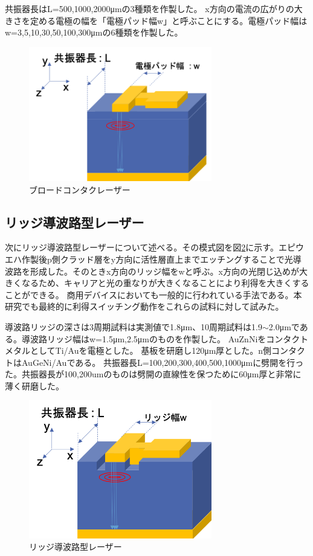 共振器長はL=500,1000,2000\si{\micro\metre}の3種類を作製した。
x方向の電流の広がりの大きさを定める電極の幅を「電極パッド幅w」と呼ぶことにする。電極パッド幅はw=3,5,10,30,50,100,300\si{\micro\metre}の6種類を作製した。

\begin{figure}[h]
	\centering
	\includegraphics[width=8cm]{figure/fig_2_1_broadcontact.png}
	\caption{ブロードコンタクレーザー}
	\label{fig:sample_broadcontact}
\end{figure}

\subsection{リッジ導波路型レーザー}%
次にリッジ導波路型レーザーについて述べる。その模式図を図\ref{fig_2_1_ridge}に示す。エピウエハ作製後p側クラッド層をy方向に活性層直上までエッチングすることで光導波路を形成した。そのときx方向のリッジ幅をwと呼ぶ。x方向の光閉じ込めが大きくなるため、キャリアと光の重なりが大きくなることにより利得を大きくすることができる。%
商用デバイスにおいても一般的に行われている手法である。本研究でも最終的に利得スイッチング動作をこれらの試料に対して試みた。

導波路リッジの深さは3周期試料は実測値で1.8\si{\micro\metre}、10周期試料は1.9$\sim$2.0\si{\micro\metre}である。導波路リッジ幅はw=1.5\si{\micro\metre},2.5\si{\micro\metre}のものを作製した。
AuZnNiをコンタクトメタルとしてTi/Auを電極とした。
基板を研磨し120\si{\micro\metre}厚とした。n側コンタクトはAuGeNi/Auである。
共振器長L=100,200,300,400,500,1000\si{\micro\metre}に劈開を行った。共振器長が100,200umのものは劈開の直線性を保つために60\si{\micro\metre}厚と非常に薄く研磨した。
\begin{figure}[h]
	\centering
	\includegraphics[width=8cm]{figure/fig_2_1_ridge.png}
	\caption{リッジ導波路型レーザー}
	\label{fig_2_1_ridge}
\end{figure}

